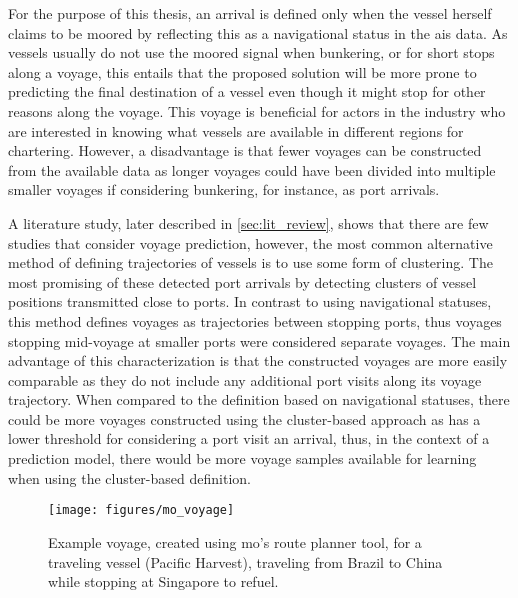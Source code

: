 For the purpose of this thesis, an arrival is defined only when the vessel herself claims to be moored by reflecting this as a navigational status in the \acrfull{ais} data. As vessels usually do not use the moored signal when bunkering, or for short stops along a voyage, this entails that the proposed solution will be more prone to predicting the final destination of a vessel even though it might stop for other reasons along the voyage. This voyage is beneficial for actors in the industry who are interested in knowing what vessels are available in different regions for chartering. However, a disadvantage is that fewer voyages can be constructed from the available data as longer voyages could have been divided into multiple smaller voyages if considering bunkering, for instance, as port arrivals.

A literature study, later described in \cref{sec:lit_review}, shows that there are few studies that consider voyage prediction, however, the most common alternative method of defining trajectories of vessels is to use some form of clustering. The most promising of these detected port arrivals by detecting clusters of vessel positions transmitted close to ports. In contrast to using navigational statuses, this method defines voyages as trajectories between stopping ports, thus voyages stopping mid-voyage at smaller ports were considered separate voyages. The main advantage of this characterization is that the constructed voyages are more easily comparable as they do not include any additional port visits along its voyage trajectory. When compared to the definition based on navigational statuses, there could be more voyages constructed using the cluster-based approach as has a lower threshold for considering a port visit an arrival, thus, in the context of a prediction model, there would be more voyage samples available for learning when using the cluster-based definition.

\begin{figure}[htbp]  %
    \centering
    \texttt{[image: figures/mo\_voyage]}
    \caption{Example voyage, created using \acrshort{mo}'s route planner tool, for a traveling vessel (Pacific Harvest), traveling from Brazil to China while stopping at Singapore to refuel.}
    \label{fig:example_voyage}
\end{figure}

